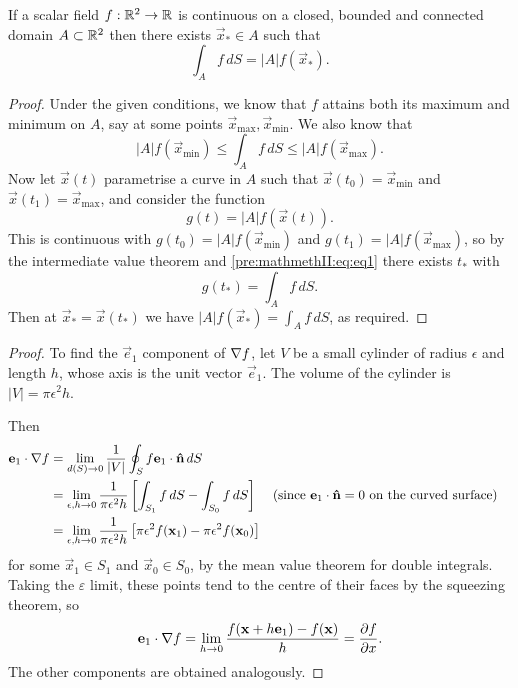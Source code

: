 \documentclass[10pt, a4paper]{article}
\begin{document}
\begin{lemma}
    If a scalar field $f : \R ^ 2 \to \R$ is continuous on a closed,
    bounded and connected domain $A \subset \R ^ 2$ then there exists $\vec{x}_{*} \in A$ such that
    \[
    \int_{A}f\,dS = |A|f(\vec{x}_{*}).
    \]

    \begin{proof}
        Under the given conditions,
        we know that $f$ attains both its maximum and minimum on $A$,
        say at some points $\vec{x}_{\text{max}}, \vec{x}_{\text{min}}$.
        We also know that
        \begin{equation}\label{pre:mathmethII:eq:eq1}\tag{$\dagger$}
            |A|f(\vec{x}_{\text{min}}) \leq \int_{A}f\,dS \leq |A|f(\vec{x}_{\text{max}}).
        \end{equation}
        Now let $\vec{x}(t)$ parametrise a curve in $A$ such that $\vec{x}(t_0) = \vec{x}_{\text{min}}$ and $\vec{x}(t_1) = \vec{x}_{\text{max}}$,
        and consider the function
        \[
        g(t) = |A|f(\vec{x}(t)).
        \]
        This is continuous with $g(t_0) = |A|f(\vec{x}_{\text{min}})$ and $g(t_1) = |A|f(\vec{x}_{\text{max}})$,
        so by the intermediate value theorem and \eqref{pre:mathmethII:eq:eq1} there exists $t_{*}$ with
        \[
        g(t_{*}) = \int_{A}f\,dS.
        \]
        Then at $\vec{x}_{*} = \vec{x}(t_{*})$ we have $|A|f(\vec{x}_{*}) = \int_{A}f\,dS$,
        as required.
    \end{proof}
\end{lemma}

\begin{proposition}
    \begin{proof}
        To find the $\vec{e}_1$ component of $\bnabla f$,
        let $V$ be a small cylinder of radius $\epsilon$ and length $h$,
        whose axis is the unit vector $\vec{e}_1$.
        The volume of the cylinder is $|V| = \pi\epsilon ^ 2h$.

        Then
        \begin{align*}
            \vec{e}_1 \cdot \bnabla f &= \lim_{d(S) \to 0}\frac{1}{|V|}\oint_{S}f\vec{e}_1\cdot\hvec{n}\,dS \\
            &= \lim_{\epsilon, h \to 0}\frac{1}{\pi\epsilon ^ 2h}\left[\int_{S_1}f\,dS - \int_{S_0}f\,dS\right] &&(\text{since $\vec{e}_1 \cdot \hvec{n} = 0$ on the curved surface}) \\
            &= \lim_{\epsilon, h \to 0}\frac{1}{\pi\epsilon ^ 2h}\left[\pi \epsilon ^ 2f(\vec{x}_1) - \pi\epsilon ^ 2f(\vec{x}_0)\right]
        \end{align*}
        for some $\vec{x}_1 \in S_1$ and $\vec{x}_0 \in S_0$,
        by the mean value theorem for double integrals.
        Taking the $\varepsilon$ limit,
        these points tend to the centre of their faces by the squeezing theorem,
        so
        \[
        \vec{e}_1 \cdot \bnabla f = \lim_{h \to 0}\frac{f(\vec{x} + h\vec{e}_1) - f(\vec{x})}{h} = \pd[f]{x}.
        \]
        The other components are obtained analogously.
    \end{proof}
\end{proposition}
\end{document}
